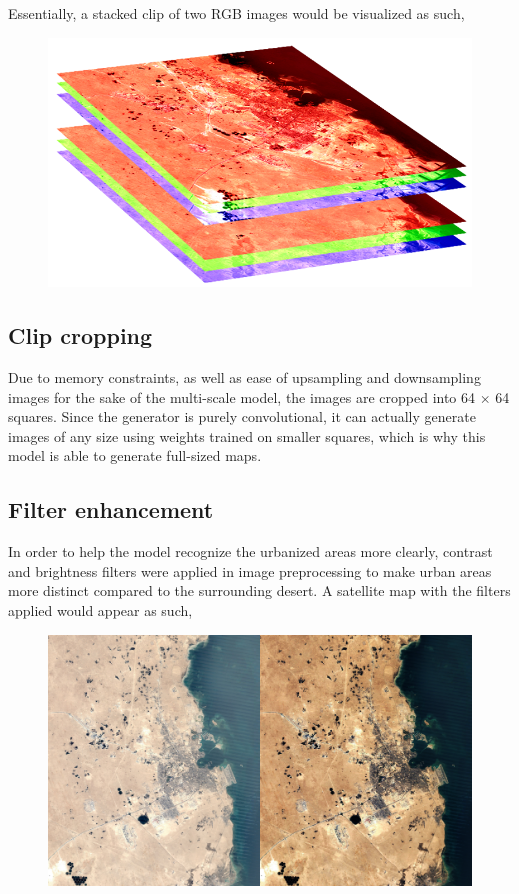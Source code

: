 \documentclass{article}
\begin{document}
Essentially, a stacked clip of two RGB images would be visualized as such,

\begin{figure}[H]
    \centering
    \includegraphics[width=0.5\linewidth]{clip-stack.png}
\end{figure}

\subsection*{Clip cropping}

Due to memory constraints, as well as ease of upsampling and downsampling images for the sake of the multi-scale model, the images are cropped into 64 $\times$ 64 squares. Since the generator is purely convolutional, it can actually generate images of any size using weights trained on smaller squares, which is why this model is able to generate full-sized maps.

\subsection*{Filter enhancement}

In order to help the model recognize the urbanized areas more clearly, contrast and brightness filters were applied in image preprocessing to make urban areas more distinct compared to the surrounding desert. A satellite map with the filters applied would appear as such,

\begin{figure}[H]
    \centering
    \includegraphics[width=0.7\linewidth]{enhanced-comp.png}
\end{figure}
\end{document}
